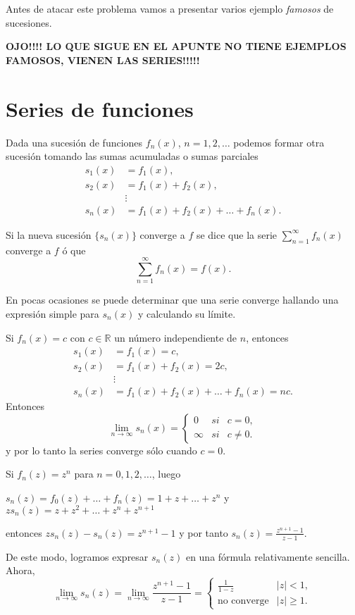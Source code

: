 Antes de atacar este problema vamos a presentar varios ejemplo \textit{famosos} de sucesiones.

\textbf{
OJO!!!! LO QUE SIGUE EN EL APUNTE NO TIENE EJEMPLOS FAMOSOS, VIENEN LAS SERIES!!!!!}

\section{Series de funciones}
Dada una sucesión de funciones $f_n(x)$, $n=1,2,\ldots$ podemos formar otra sucesión tomando las sumas acumuladas o
sumas parciales
\[
\begin{split}
s_1(x)&=f_1(x),
\\
s_2(x)&=f_1(x)+f_2(x),
\\
&\vdots
\\
s_n(x)&=f_1(x)+f_2(x)+\ldots+f_n(x).
\end{split}
\]

Si la nueva sucesión $\{s_n(x)\}$ converge a $f$ se dice que la serie $\sum\limits_{n=1}^{\infty} f_n(x)$
converge a $f$ ó que 
\[
\sum\limits_{n=1}^{\infty} f_n(x)=f(x).
\]

En pocas ocasiones se puede determinar que una serie converge hallando una expresión simple para $s_n(x)$ y
calculando su límite.

\begin{ejemplo}{}
Si $f_n(x)=c$ con $c \in \mathbb{R}$ un número independiente de $n$, entonces
\[
\begin{split}
s_1(x)&=f_1(x)=c,
\\
s_2(x)&=f_1(x)+f_2(x)=2c,
\\
&\vdots
\\
s_n(x)&=f_1(x)+f_2(x)+\ldots+f_n(x)=nc.
\end{split}
\]
Entonces
\[
\lim\limits_{n \to \infty} s_n(x)=
\left\{
\begin{array}{lll}
0&si&c=0,
\\
\infty&si&c\neq 0.
\end{array}
\right.
\]
y por lo tanto la series converge sólo cuando $c=0$.
\end{ejemplo}

\begin{ejemplo}{}
Si $f_n(z)=z^n$ para $n=0,1,2,\ldots$, luego
 
$s_n(z)=f_0(z)+\ldots+f_n(z)=1+z+\ldots+z^n$ y $zs_n(z)=z+z^2+\ldots+z^n+z^{n+1}$ 

entonces
$zs_n(z)-s_n(z)=z^{n+1}-1$ y por tanto $s_n(z)=\frac{z^{n+1}-1}{z-1}$.

De este modo, logramos expresar $s_n(z)$ en una fórmula relativamente sencilla. Ahora, 
\[
\lim\limits_{n \to \infty} s_n(z)=
\lim\limits_{n \to \infty} \frac{z^{n+1}-1}{z-1}=
\left\{\begin{array}{ll}
\frac{1}{1-z}&|z|<1,
\\
\mbox{no converge}&|z|\geq 1.
\end{array}
\right.
\]
\end{ejemplo}

